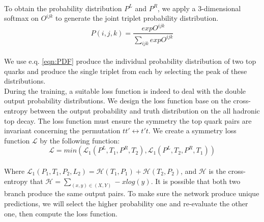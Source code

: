 \\
To obtain the probability distribution $P^{L}$ and $P^{R}$, we apply a 3-dimensional softmax on $O^{ijk}$ to generate the joint triplet probability distribution.
\\
\begin{equation}[h]\label{eqn:PDF}
	P(i,j,k) = \frac{exp O^{ijk}}{\sum_{ijk} exp O^{ijk}}
\end{equation}
\\
We use e.q. \ref{eqn:PDF} produce the individual probability distribution of two top quarks and produce the single triplet from each by selecting the peak of these distributions. 
\\
During the training, a suitable loss function is indeed to deal with the double output probability distributions. We design the loss function base on the cross-entropy between the output probability and truth distribution on the all hadronic top decay. The loss function must ensure the symmetry the top quark pairs are invariant concerning the permutation $tt' \leftrightarrow t't$.  We create a symmetry loss function $\mathcal{L}$ by the following function:
\\
\begin{equation}
	\mathcal{L} = min(\mathcal{L}_{1}(P^{L}, T_{1}, P^{R}, T_{2}), \mathcal{L}_{1}(P^{L}, T_{2}, P^{R}, T_{1}))
\end{equation}
\\
Where $\mathcal{L}_{1}(P_{1}, T_{1}, P_{2}, L_{2}) = \mathcal{H}(T_{1}, P_{1}) +\mathcal{H}(T_{2}, P_{2})$, and $\mathcal{H}$ is the cross-entropy that $\mathcal{H} = \sum_{(x,y)\in (X,Y)} -xlog(y)$. It is possible that both two branch produce the same output pairs. To make sure the network produce unique predictions, we will select the higher probability one and re-evaluate the other one, then compute the loss function.











